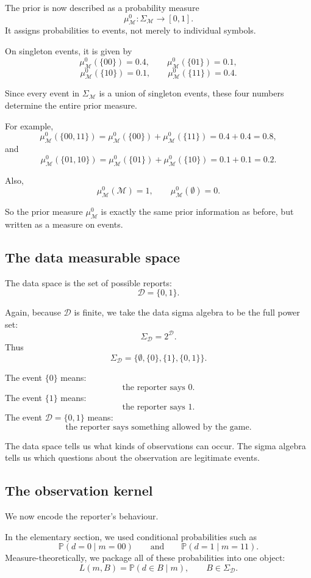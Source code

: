 \documentclass[11pt]{article}
\newcommand{\M}{\mathcal{M}}
\newcommand{\D}{\mathcal{D}}
\newcommand{\SigmaM}{\Sigma_{\M}}
\newcommand{\SigmaD}{\Sigma_{\D}}
\newcommand{\muMzero}{\mu^0_{\M}}
\begin{document}
The prior is now described as a probability measure
\[
    \muMzero:\SigmaM\to[0,1].
\]
It assigns probabilities to events, not merely to individual symbols.

On singleton events, it is given by
\[
    \muMzero(\{00\})=0.4,
    \qquad
    \muMzero(\{01\})=0.1,
\]
\[
    \muMzero(\{10\})=0.1,
    \qquad
    \muMzero(\{11\})=0.4.
\]

Since every event in \(\SigmaM\) is a union of singleton events, these four numbers determine the entire prior measure.

For example,
\[
    \muMzero(\{00,11\})
    =
    \muMzero(\{00\})+\muMzero(\{11\})
    =
    0.4+0.4
    =
    0.8,
\]
and
\[
    \muMzero(\{01,10\})
    =
    \muMzero(\{01\})+\muMzero(\{10\})
    =
    0.1+0.1
    =
    0.2.
\]

Also,
\[
    \muMzero(\M)=1,
    \qquad
    \muMzero(\emptyset)=0.
\]

So the prior measure \(\muMzero\) is exactly the same prior information as before, but written as a measure on events.

\subsection{The data measurable space}

The data space is the set of possible reports:
\[
    \D=\{0,1\}.
\]

Again, because \(\D\) is finite, we take the data sigma algebra to be the full power set:
\[
    \SigmaD = 2^{\D}.
\]
Thus
\[
    \SigmaD
    =
    \{\emptyset,\{0\},\{1\},\{0,1\}\}.
\]

The event \(\{0\}\) means:
\[
    \text{the reporter says }0.
\]
The event \(\{1\}\) means:
\[
    \text{the reporter says }1.
\]
The event \(\D=\{0,1\}\) means:
\[
    \text{the reporter says something allowed by the game}.
\]

The data space tells us what kinds of observations can occur. The sigma algebra tells us which questions about the observation are legitimate events.

\subsection{The observation kernel}

We now encode the reporter's behaviour.

In the elementary section, we used conditional probabilities such as
\[
    \mathbb{P}(d=0\mid m=00)
    \qquad
    \text{and}
    \qquad
    \mathbb{P}(d=1\mid m=11).
\]
Measure-theoretically, we package all of these probabilities into one object:
\[
    L(m,B)
    =
    \mathbb{P}(d\in B\mid m),
    \qquad
    B\in\SigmaD.
\]
\end{document}
